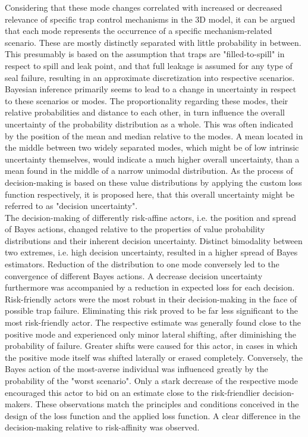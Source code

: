 	Considering that these mode changes correlated with increased or decreased relevance of specific trap control mechanisms in the 3D model, it can be argued that each mode represents the occurrence of a specific mechanism-related scenario. These are mostly distinctly separated with little probability in between. This presumably is based on the assumption that traps are "filled-to-spill" in respect to spill and leak point, and that full leakage is assumed for any type of seal failure, resulting in an approximate discretization into respective scenarios.\\
	Bayesian inference primarily seems to lead to a change in uncertainty in respect to these scenarios or modes. The proportionality regarding these modes, their relative probabilities and distance to each other, in turn influence the overall uncertainty of the probability distribution as a whole. This was often indicated by the position of the mean and median relative to the modes. A mean located in the middle between two widely separated modes, which might be of low intrinsic uncertainty themselves, would indicate a much higher overall uncertainty, than a mean found in the middle of a narrow unimodal distribution.
	As the process of decision-making is based on these value distributions by applying the custom loss function respectively, it is proposed here, that this overall uncertainty might be referred to as "decision uncertainty".\\	
	The decision-making of differently risk-affine actors, i.e. the position and spread of Bayes actions, changed relative to the properties of value probability distributions and their inherent decision uncertainty. Distinct bimodality between two extremes, i.e. high decision uncertainty, resulted in a higher spread of Bayes estimators. Reduction of the distribution to one mode conversely led to the convergence of different Bayes actions. A decrease decision uncertainty furthermore was accompanied by a reduction in expected loss for each decision. Risk-friendly actors were the most robust in their decision-making in the face of possible trap failure. Eliminating this risk proved to be far less significant to the most risk-friendly actor. The respective estimate was generally found close to the positive mode and experienced only minor lateral shifting, after diminishing the probability of failure. Greater shifts were caused for this actor, in cases in which the positive mode itself was shifted laterally or erased completely. Conversely, the Bayes action of the most-averse individual was influenced greatly by the probability of the "worst scenario". Only a stark decrease of the respective mode encouraged this actor to bid on an estimate close to the risk-friendlier decision-makers. These observations match the principles and conditions conceived in the design of the loss function and the applied loss function. A clear difference in the decision-making relative to risk-affinity was observed.\\
